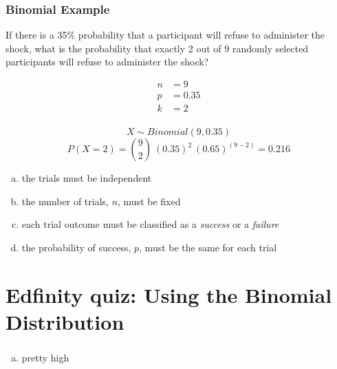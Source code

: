 \documentclass[slidestop,compress,mathserif]{beamer}
\begin{document}

\begin{frame}
\frametitle{Binomial Example}
If there is a 35\% probability that a participant will refuse to administer the shock, what is the probability that exactly 2 out of 9 randomly selected participants will refuse to administer the shock?

\pause

\begin{align*}
n&=9  \\
p&=0.35 \\
k&=2 \\
\end{align*}

\pause

\[X\sim Binomial(9, 0.35)\]
\[P(X=2) = {9 \choose 2}~(0.35)^2~(0.65)^{(9-2)} = 0.216\]

\end{frame}

\begin{frame}


\begin{enumerate}[(a)]
\item the trials must be independent
\item the number of trials, $n$, must be fixed
\item each trial outcome must be classified as a \textit{success} or a \textit{failure}
\item the probability of success, $p$, must be the same for each trial
\end{enumerate}

\end{frame}




\section{Edfinity quiz: Using the Binomial Distribution}


\begin{frame}
\frametitle{}


\begin{enumerate}[(a)]
\item pretty high
\end{enumerate}

\vfill


\end{frame}
\end{document}
